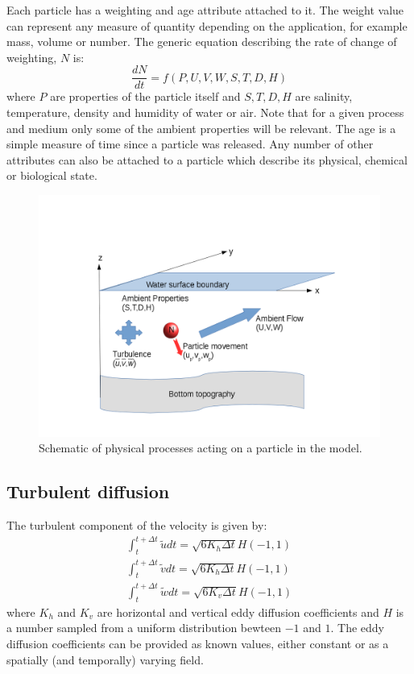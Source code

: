 \documentclass[a4paper]{article}
\begin{document}
Each particle has a weighting and age attribute attached to it. The weight value can represent any measure of quantity depending on the application, for example mass, volume or number.
The generic equation describing the rate of change of weighting, $N$ is:
\begin{equation}\frac{dN}{dt}=f(P,U,V,W,S,T,D,H)\end{equation}
where $P$ are properties of the particle itself and $S,T,D,H$ are salinity, temperature, density and humidity of water or air.
Note that for a given process and medium only some of the ambient properties will be relevant. The age is a simple measure of time since a particle was released.
Any number of other attributes can also be attached to a particle which describe its physical, chemical or biological state.

\begin{figure}
\includegraphics[width=\textwidth]{model.png}
\caption{Schematic of physical processes acting on a particle in the model.}
\end{figure}

\subsection{Turbulent diffusion}
The turbulent component of the velocity is given by:
\begin{align}
\int_{t}^{t+\Delta t} \tilde{u} dt = \sqrt{6K_h \Delta t} H(-1,1) \\
\int_{t}^{t+\Delta t} \tilde{v} dt = \sqrt{6K_h \Delta t} H(-1,1) \\
\int_{t}^{t+\Delta t} \tilde{w} dt = \sqrt{6K_v \Delta t} H(-1,1)
\end{align}
where $K_h$ and $K_v$ are horizontal and vertical eddy diffusion coefficients and $H$ is a number sampled from a uniform distribution bewteen $-1$ and $1$.
The eddy diffusion coefficients can be provided as known values, either constant or as a spatially (and temporally) varying field.
\end{document}
